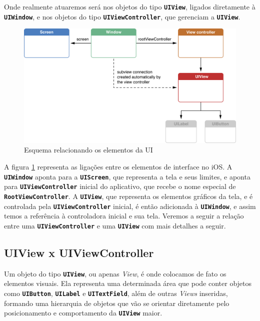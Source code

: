\documentclass[a4paper,12pt,brazil,oneside]{book}
\begin{document}
Onde realmente atuaremos será nos objetos do tipo \texttt{\textbf{UIView}}, ligados diretamente à \texttt{\textbf{UIWindow}}, e nos objetos do tipo \texttt{\textbf{UIViewController}}, que gerenciam a \texttt{\textbf{UIView}}.

\begin{figure}[H]
  \centering
  \includegraphics[width=.75\textwidth]{figuras/apple_window_view_controller_screen.png}
  \caption{Esquema relacionando os elementos da UI}
  \label{fig:relacionamento_UI}
\end{figure}

A figura \ref{fig:relacionamento_UI} representa as ligações entre os elementos de interface no iOS. A \texttt{\textbf{UIWindow}} aponta para a \texttt{\textbf{UIScreen}}, que representa a tela e seus limites, e aponta para  \texttt{\textbf{UIViewController}} inicial do aplicativo, que recebe o nome especial de \texttt{\textbf{RootViewController}}. A \texttt{\textbf{UIView}}, que representa os elementos gráficos da tela, e é controlada pela \texttt{\textbf{UIViewController}} inicial, é então adicionada à \texttt{\textbf{UIWindow}}, e assim temos a referência à controladora inicial e sua tela. Veremos a seguir a relação entre uma \texttt{\textbf{UIViewController}} e uma \texttt{\textbf{UIView}} com mais detalhes a seguir.

\subsection{UIView x UIViewController}


Um objeto do tipo \texttt{\textbf{UIView}}, ou apenas \emph{View}, é onde colocamos de fato os elementos visuais. Ela representa uma determinada área que pode conter objetos como \texttt{\textbf{UIButton}}, \texttt{\textbf{UILabel}} e \texttt{\textbf{UITextField}}, além de outras \emph{Views} inseridas, formando uma hierarquia de objetos que vão se orientar diretamente pelo posicionamento e comportamento da \texttt{\textbf{UIView}} maior.
\end{document}
